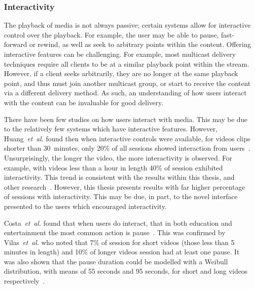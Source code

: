 \subsubsection{Interactivity}




    The playback of media is not always passive; certain systems allow for interactive control over the playback. For example, the user may be able to pause, fast-forward or rewind, as well as seek to arbitrary points within the content. Offering interactive features can be challenging. For example, most multicast delivery techniques require all clients to be at a similar playback point within the stream. However, if a client seeks arbitrarily, they are no longer at the same playback point, and thus must join another multicast group, or start to receive the content via a different delivery method. As such, an understanding of how users interact with the content can be invaluable for good delivery.

    There have been few studies on how users interact with media. This may be due to the relatively few systems which have interactive features. However, Huang~\emph{et~al.} found then when interactive controls were available, for videos clips shorter than 30~minutes, only 20\% of all sessions showed interaction from users~\cite{huang2007civ}. Unsurprisingly, the longer the video, the more interactivity is observed. For example, with videos less than a hour in length 40\% of session exhibited interactivity. This trend is consistent with the results within this thesis, and other research~\cite{costa2004aci}. However, this thesis presents results with far higher percentage of sessions with interactivity. This may be due, in part, to the novel interface presented to the users which encouraged interactivity.

    Costa~\emph{et~al.} found that when users do interact, that in both education and entertainment the most common action is pause~\cite{costa2004aci}. This was confirmed by Vilas~\emph{et~al.} who noted that 7\% of session for short videos (those less than 5 minutes in length) and 10\% of longer videos session had at least one pause. It was also shown that the pause duration could be modelled with a Weibull distribution, with means of 55 seconds and 95 seconds, for short and long videos respectively~\cite{vilas2005uba}.


